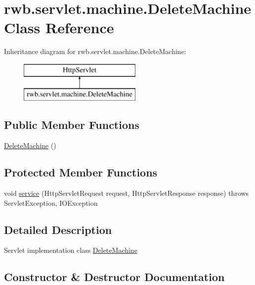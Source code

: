 \hypertarget{classrwb_1_1servlet_1_1machine_1_1_delete_machine}{}\section{rwb.\+servlet.\+machine.\+Delete\+Machine Class Reference}
\label{classrwb_1_1servlet_1_1machine_1_1_delete_machine}
Inheritance diagram for rwb.\+servlet.\+machine.\+Delete\+Machine\+:\begin{figure}[H]
\begin{center}
\leavevmode
\includegraphics[height=2.000000cm]{classrwb_1_1servlet_1_1machine_1_1_delete_machine}
\end{center}
\end{figure}
\subsection*{Public Member Functions}
\begin{DoxyCompactItemize}
\item 
\hyperlink{classrwb_1_1servlet_1_1machine_1_1_delete_machine_ad0ceaff95befb7f21080fcb9bb8f9456}{Delete\+Machine} ()
\end{DoxyCompactItemize}
\subsection*{Protected Member Functions}
\begin{DoxyCompactItemize}
\item 
void \hyperlink{classrwb_1_1servlet_1_1machine_1_1_delete_machine_aea329f627d912380bb5f8bb0224e94bf}{service} (Http\+Servlet\+Request request, Http\+Servlet\+Response response)  throws Servlet\+Exception, I\+O\+Exception 
\end{DoxyCompactItemize}


\subsection{Detailed Description}
Servlet implementation class \hyperlink{classrwb_1_1servlet_1_1machine_1_1_delete_machine}{Delete\+Machine} 

\subsection{Constructor \& Destructor Documentation}
\mbox{\label{classrwb_1_1servlet_1_1machine_1_1_delete_machine_ad0ceaff95befb7f21080fcb9bb8f9456}} 
